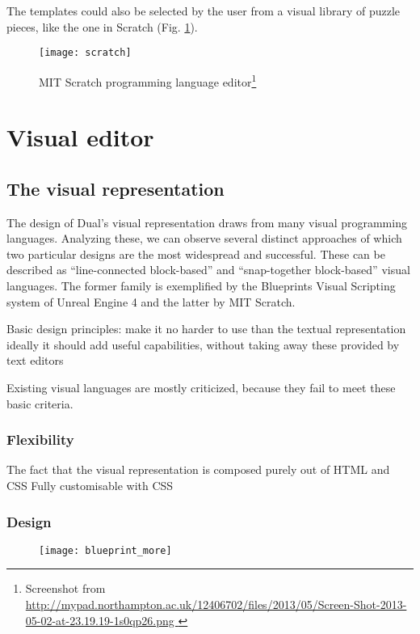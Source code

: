 The templates could also be selected by the user from a visual library of puzzle
pieces, like the one in Scratch (Fig. \ref{fig:scratch}).
\begin{figure}[h!]
\centering \texttt{[image: scratch]}
\caption{ MIT Scratch programming language editor\protect\footnote{ Screenshot
    from \url{
      http://mypad.northampton.ac.uk/12406702/files/2013/05/Screen-Shot-2013-05-02-at-23.19.19-1s0qp26.png
} } }
\label{fig:scratch}
\end{figure}


\section{Visual editor}
\subsection{The visual representation}
The design of Dual's visual representation draws from many visual programming
languages. Analyzing these, we can observe several distinct approaches of which two particular designs are the most widespread and successful. These can be
described as ``line-connected block-based'' and ``snap-together block-based''
visual languages. The former family is exemplified by the Blueprints Visual
Scripting system of Unreal Engine 4\cite{blueprint} and the latter by MIT Scratch\cite{scratch, scratch_wikipedia}.


Basic design principles: make it no harder to use than the textual
representation ideally it should add useful capabilities, without taking away
these provided by text editors

Existing visual languages are mostly criticized, because they fail to meet these
basic criteria.

\subsubsection{Flexibility}
The fact that the visual representation is composed purely out of HTML and CSS
Fully customisable with CSS

\subsubsection{Design}
\begin{figure}[h!]
\centering \texttt{[image: blueprint\_more]}
\caption{}
\label{fig:blueprint_more}
\end{figure}

